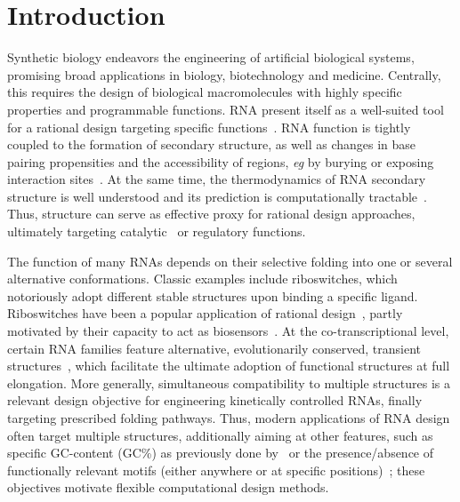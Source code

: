 \documentclass{bioinfo}
\newcommand{\parHead}[1]{\Final{\paragraph{#1}}}
\newcommand{\Final}[1]{\begingroup\color{red!70!black}#1\endgroup}
\renewcommand{\Final}[1]{}
\newcommand{\Nuc}[1]{{\sf #1}}
\newcommand{\Cb}{\Nuc{C}}
\newcommand{\Gb}{\Nuc{G}}
\newcommand{\GCb}{\Gb\Cb}
\begin{document}
\maketitle


\enlargethispage{35.1pt}
\section{Introduction}
\parHead{Design, applications and motivation for multiple design.}Synthetic biology endeavors the engineering of artificial biological
systems, promising broad applications in biology, biotechnology and
medicine. Centrally, this requires the design of biological
macromolecules with highly specific properties and programmable functions.
RNA present itself as a well-suited tool for a
rational design targeting specific functions~\citep{Kushwaha2016}. RNA function is tightly
coupled to the formation of secondary structure, as well as changes in
base pairing propensities and the accessibility of regions, \emph{eg} by
burying or exposing interaction sites~\citep{Rodrigo2014}. At the same time, the
thermodynamics of RNA secondary structure is well understood and its prediction is
computationally tractable~\citep{McCaskill1990}. Thus,  structure can serve as effective
proxy for rational design approaches, ultimately targeting catalytic~\citep{Zhang2013} or regulatory functions.

\parHead{Motivating multiple RNA design.} The function of many RNAs
depends on their selective folding into one or several alternative
conformations. Classic examples include riboswitches, which
notoriously adopt different stable structures upon binding a specific
ligand. Riboswitches have been a popular application of rational
design~\citep{Wachsmuth2013,Domin2017}, partly motivated by their
capacity to act as biosensors~\citep{Findeiss2017}. At the
co-transcriptional level, certain RNA families feature alternative,
evolutionarily conserved, transient structures~\citep{Zhu2013}, which
facilitate the ultimate adoption of functional structures at full
elongation.  More generally, simultaneous compatibility to multiple
structures is a relevant design objective for engineering kinetically
controlled RNAs, finally targeting prescribed folding pathways. Thus,
modern applications of RNA design often target multiple structures,
additionally aiming at other features, such as specific
\GCb-content (\GCb\%) as previously done by~\citet{Reinharz2013} or the presence/absence of
functionally relevant motifs (either anywhere or at specific
positions)~\citep{Zhou2013}; these objectives motivate flexible
computational design methods.
\end{document}
